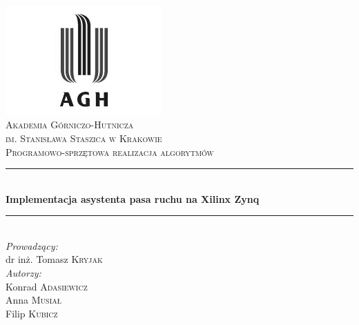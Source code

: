 \begin{titlepage}

\newcommand{\HRule}{\rule{\linewidth}{0.5mm}}

\center
 

\includegraphics[width=6cm]{../res/img/logo.png}\\[1cm]
 
 

\textsc{\LARGE Akademia Górniczo-Hutnicza \\[0.2cm]
im. Stanisława Staszica w Krakowie}\\[1.5cm]

\textsc{\Large Programowo-sprzętowa realizacja algorytmów}\\[0.5cm]


\HRule \\[0.5cm]
{ \huge \bfseries Implementacja asystenta pasa ruchu na Xilinx Zynq}\\[0.3cm]
\HRule \\[1.5cm]

\flushright
\Large \emph{Prowadzący:}\\
dr inż. Tomasz \textsc{Kryjak}\\[1cm]
\Large \emph{Autorzy:}\\
Konrad \textsc{Adasiewicz}\\[0.1cm]        %
Anna \textsc{Musiał}\\[0.1cm]  %
Filip \textsc{Kubicz}\\[3cm]



\end{titlepage}

